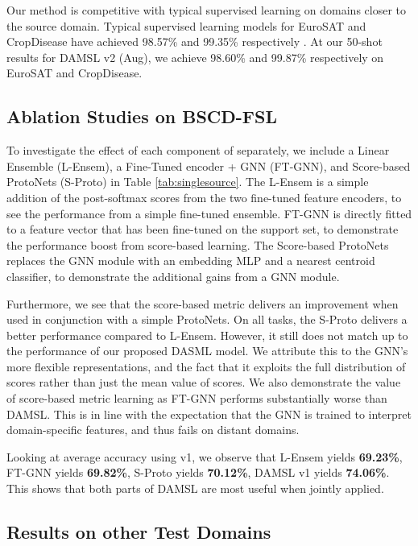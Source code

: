 \documentclass[final]{cvpr}
\begin{document}
Our method is competitive with typical supervised learning on domains closer to the source domain. Typical supervised learning models for EuroSAT and CropDisease have achieved 98.57\% and 99.35\% respectively \cite{helber2019eurosat} \cite{mohanty2016using}. At our 50-shot results for DAMSL v2 (Aug), we achieve 98.60\% and 99.87\% respectively on EuroSAT and CropDisease. 

\subsection{Ablation Studies on BSCD-FSL}
To investigate the effect of each component of separately, we include a Linear Ensemble (L-Ensem), a Fine-Tuned encoder + GNN (FT-GNN), and Score-based ProtoNets (S-Proto) in Table \ref{tab:singlesource}. The L-Ensem is a simple addition of the post-softmax scores from the two fine-tuned feature encoders, to see the performance from a simple fine-tuned ensemble. FT-GNN is directly fitted to a feature vector that has been fine-tuned on the support set, to demonstrate the performance boost from score-based learning. The Score-based ProtoNets replaces the GNN module with an embedding MLP and a nearest centroid classifier, to demonstrate the additional gains from a GNN module.

Furthermore, we see that the score-based metric delivers an improvement when used in conjunction with a simple ProtoNets. On all tasks, the S-Proto delivers a better performance compared to L-Ensem. However, it still does not match up to the performance of our proposed DASML model. We attribute this to the GNN's more flexible representations, and the fact that it exploits the full distribution of scores rather than just the mean value of scores. We also demonstrate the value of score-based metric learning as FT-GNN performs substantially worse than DAMSL. This is in line with the expectation that the GNN is trained to interpret domain-specific features, and thus fails on distant domains.

Looking at average accuracy using v1, we observe that L-Ensem yields \textbf{69.23\%}, FT-GNN yields \textbf{69.82\%}, S-Proto yields \textbf{70.12\%}, DAMSL v1 yields \textbf{74.06\%}. This shows that both parts of DAMSL are most useful when jointly applied.  

\subsection{Results on other Test Domains}
\end{document}
